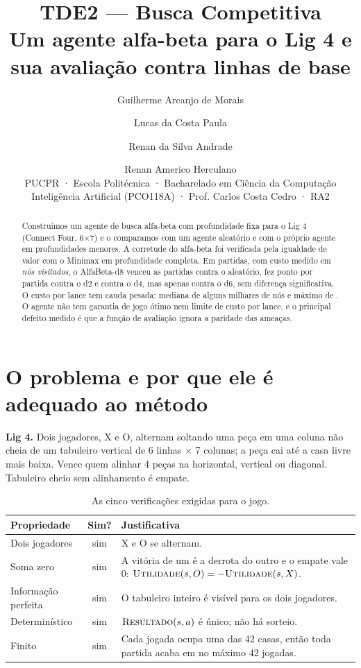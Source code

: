\documentclass[11pt,a4paper]{article}
\title{\textbf{TDE2 --- Busca Competitiva}\\[2pt]
  \large Um agente alfa-beta para o Lig 4 e sua avaliação contra linhas de base}
\author{Guilherme Arcanjo de Morais \and Lucas da Costa Paula \and Renan da Silva Andrade \and Renan Americo Herculano\\[6pt]
  \small PUCPR · Escola Politécnica · Bacharelado em Ciência da Computação\\
  \small Inteligência Artificial (PCO118A) · Prof. Carlos Costa Cedro · RA2}
\date{}
\newcommand{\fn}[1]{\textsc{#1}}            %
\begin{document}
\maketitle

\begin{abstract}
\noindent
Construímos um agente de busca alfa-beta com profundidade fixa para o Lig 4 (Connect Four, 6×7) e o
comparamos com um agente aleatório e com o próprio agente em profundidades menores. A corretude do
alfa-beta foi verificada pela igualdade de valor com o Minimax em profundidade completa. Em
 partidas, com custo medido em \emph{nós visitados}, o AlfaBeta-d8 venceu as
 partidas contra o aleatório, fez  ponto por partida contra o d2 e
 contra o d4, mas apenas  contra o d6, sem diferença significativa. O custo por lance
tem cauda pesada: mediana de alguns milhares de nós e máximo de . O agente não tem garantia de jogo
ótimo nem limite de custo por lance, e o principal defeito medido é que a função de avaliação ignora a paridade
das ameaças.
\end{abstract}

\tableofcontents

\section{O problema e por que ele é adequado ao método}

\textbf{Lig 4.} Dois jogadores, X e O, alternam soltando uma peça em uma coluna não cheia de um tabuleiro
vertical de 6 linhas × 7 colunas; a peça cai até a casa livre mais baixa. Vence quem alinhar 4 peças na
horizontal, vertical ou diagonal. Tabuleiro cheio sem alinhamento é empate.

\begin{table}[H]
\centering\small
\caption{As cinco verificações exigidas para o jogo.}
\label{tab:cinco}
\begin{tabularx}{\linewidth}{lcY}
\toprule
Propriedade & Sim? & Justificativa \\
\midrule
Dois jogadores & sim & X e O se alternam. \\
Soma zero & sim & A vitória de um é a derrota do outro e o empate vale 0: $\fn{Utilidade}(s,O) = -\fn{Utilidade}(s,X)$. \\
Informação perfeita & sim & O tabuleiro inteiro é visível para os dois jogadores. \\
Determinístico & sim & $\fn{Resultado}(s,a)$ é único; não há sorteio. \\
Finito & sim & Cada jogada ocupa uma das 42 casas, então toda partida acaba em no máximo 42 jogadas. \\
\bottomrule
\end{tabularx}
\end{table}
\end{document}
